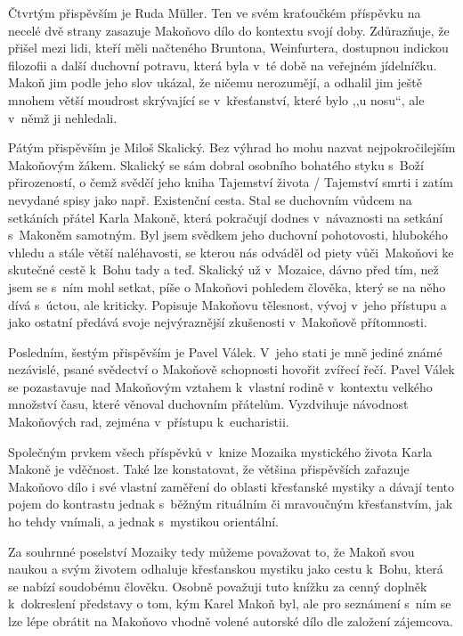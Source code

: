 Čtvrtým přispěvším je Ruda Müller. Ten ve svém kraťoučkém příspěvku na necelé
dvě strany zasazuje Makoňovo dílo do kontextu svojí doby. Zdůrazňuje, že přišel
mezi lidi, kteří měli načteného Bruntona,\cite{brunton1951hidden}
Weinfurtera,\cite{weinfurter1923ohnivy} dostupnou indickou
filozofii\cite{weinfurter1935bhagavadgita} a další duchovní potravu, která byla v~té době na veřejném jídelníčku.
Makoň jim podle jeho slov ukázal, že ničemu nerozumějí, a odhalil jim ještě
mnohem větší moudrost skrývající se v~křesťanství, které bylo ,,u nosu``, ale
v~němž ji nehledali.

Pátým přispěvším je Miloš Skalický. Bez výhrad ho mohu nazvat nejpokročilejším
Makoňovým žákem. Skalický se sám dobral osobního bohatého styku s~Boží
přirozeností, o čemž svědčí jeho kniha Tajemství života / Tajemství
smrti\cite{skalicky2022tajemstvi} i zatím nevydané spisy jako např. Existenční
cesta. Stal se duchovním vůdcem na setkáních přátel Karla Makoně, která
pokračují dodnes v~návaznosti na setkání s~Makoněm samotným. Byl jsem svědkem
jeho duchovní pohotovosti, hlubokého vhledu a stále větší naléhavosti, se kterou
nás odváděl od piety vůči~Makoňovi ke skutečné cestě k~Bohu tady a teď. Skalický už
v~Mozaice, dávno před tím, než jsem se s~ním mohl setkat, píše o Makoňovi
pohledem člověka, který se na něho dívá s~úctou, ale kriticky. Popisuje Makoňovu
tělesnost, vývoj v~jeho přístupu a jako ostatní předává svoje nejvýraznější
zkušenosti v~Makoňově přítomnosti.

Posledním, šestým přispěvším je Pavel Válek. V~jeho stati je mně jediné známé
nezávislé, psané svědectví o Makoňově schopnosti hovořit zvířecí řečí. Pavel
Válek se pozastavuje nad Makoňovým vztahem k~vlastní rodině v~kontextu velkého
množství času, které věnoval duchovním přátelům. Vyzdvihuje návodnost Makoňových
rad, zejména v~přístupu k~eucharistii.

Společným prvkem všech příspěvků v~knize Mozaika mystického života Karla Makoně
je vděčnost. Také lze konstatovat, že většina přispěvších zařazuje Makoňovo dílo
i své vlastní zaměření do oblasti křesťanské mystiky a dávají tento pojem do
kontrastu jednak s~běžným rituálním či mravoučným křesťanstvím, jak ho tehdy
vnímali, a jednak s~mystikou orientální.

Za souhrnné poselství Mozaiky tedy můžeme považovat to, že Makoň svou naukou a
svým životem odhaluje křesťanskou mystiku jako cestu k~Bohu, která se nabízí
soudobému člověku. Osobně považuji tuto knížku za cenný doplněk k~dokreslení
představy o tom, kým Karel Makoň byl, ale pro seznámení s~ním se lze lépe
obrátit na Makoňovo vhodně volené autorské dílo dle založení zájemcova.

